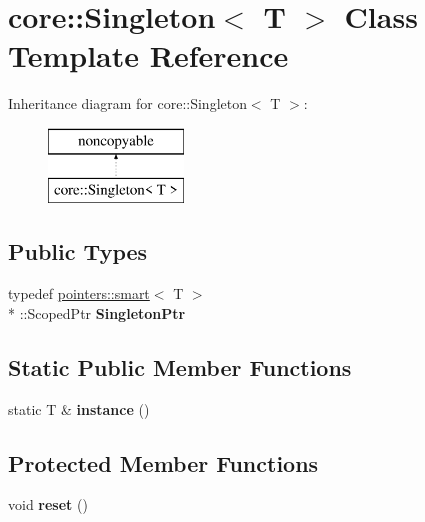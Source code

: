 \hypertarget{classcore_1_1_singleton}{\section{core\-:\-:Singleton$<$ T $>$ Class Template Reference}
\label{classcore_1_1_singleton}
}
Inheritance diagram for core\-:\-:Singleton$<$ T $>$\-:\begin{figure}[H]
\begin{center}
\leavevmode
\includegraphics[height=2.000000cm]{classcore_1_1_singleton}
\end{center}
\end{figure}
\subsection*{Public Types}
\begin{DoxyCompactItemize}
\item 
\hypertarget{classcore_1_1_singleton_ab48666722b7eba6a57bdc960082f729f}{typedef \hyperlink{structcore_1_1pointers_1_1smart}{pointers\-::smart}$<$ T $>$\\*
\-::Scoped\-Ptr {\bfseries Singleton\-Ptr}}\label{classcore_1_1_singleton_ab48666722b7eba6a57bdc960082f729f}

\end{DoxyCompactItemize}
\subsection*{Static Public Member Functions}
\begin{DoxyCompactItemize}
\item 
\hypertarget{classcore_1_1_singleton_a6f7a4f37c1e6df7967ab6e735074542a}{static T \& {\bfseries instance} ()}\label{classcore_1_1_singleton_a6f7a4f37c1e6df7967ab6e735074542a}

\end{DoxyCompactItemize}
\subsection*{Protected Member Functions}
\begin{DoxyCompactItemize}
\item 
\hypertarget{classcore_1_1_singleton_a078618c2c5cd9701bcbf17899584352f}{void {\bfseries reset} ()}\label{classcore_1_1_singleton_a078618c2c5cd9701bcbf17899584352f}

\end{DoxyCompactItemize}
